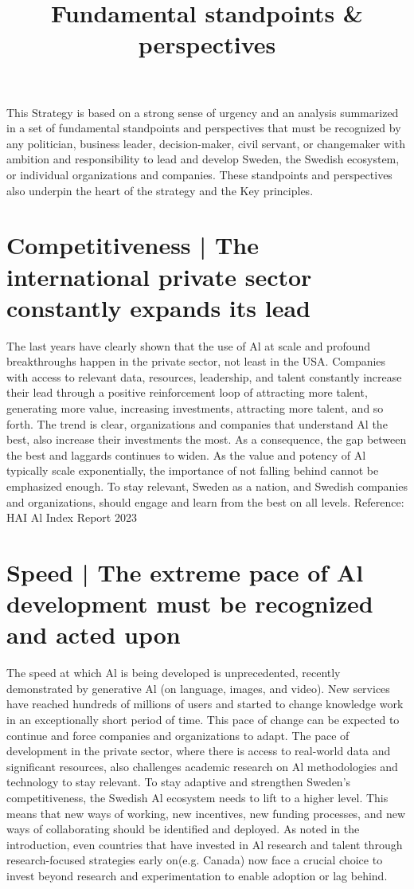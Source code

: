 \title{
Fundamental standpoints \& perspectives
}
This Strategy is based on a strong sense of urgency and an analysis summarized in a set of fundamental standpoints and perspectives that must be recognized by any politician, business leader, decision-maker, civil servant, or changemaker with ambition and responsibility to lead and develop Sweden, the Swedish ecosystem, or individual organizations and companies.
These standpoints and perspectives also underpin the heart of the strategy and the Key principles.
\section*{Competitiveness | The international private sector constantly expands its lead}
The last years have clearly shown that the use of Al at scale and profound breakthroughs happen in the private sector, not least in the USA. Companies with access to relevant data, resources, leadership, and talent constantly increase their lead through a positive reinforcement loop of attracting more talent, generating more value, increasing investments, attracting more talent, and so forth.
The trend is clear, organizations and companies that understand Al the best, also increase their investments the most. As a consequence, the gap between the best and laggards continues to widen. As the value and potency of Al typically scale exponentially, the importance of not falling behind cannot be emphasized enough.
To stay relevant, Sweden as a nation, and Swedish companies and organizations, should engage and learn from the best on all levels.
Reference: HAI Al Index Report 2023
\section*{Speed | The extreme pace of Al development must be recognized and acted upon}
The speed at which Al is being developed is unprecedented, recently demonstrated by generative Al (on language, images, and video). New services have reached hundreds of millions of users and started to change knowledge work in an exceptionally short period of time.
This pace of change can be expected to continue and force companies and organizations to adapt. The pace of development in the private sector, where there is access to real-world data and significant resources, also challenges academic research on Al methodologies and technology to stay relevant.
To stay adaptive and strengthen Sweden's competitiveness, the Swedish Al ecosystem needs to lift to a higher level. This means that new ways of working, new incentives, new funding processes, and new ways of collaborating should be identified and deployed.
As noted in the introduction, even countries that have invested in Al research and talent through research-focused strategies early on(e.g. Canada) now face a crucial choice to invest beyond research and experimentation to enable adoption or lag behind.

